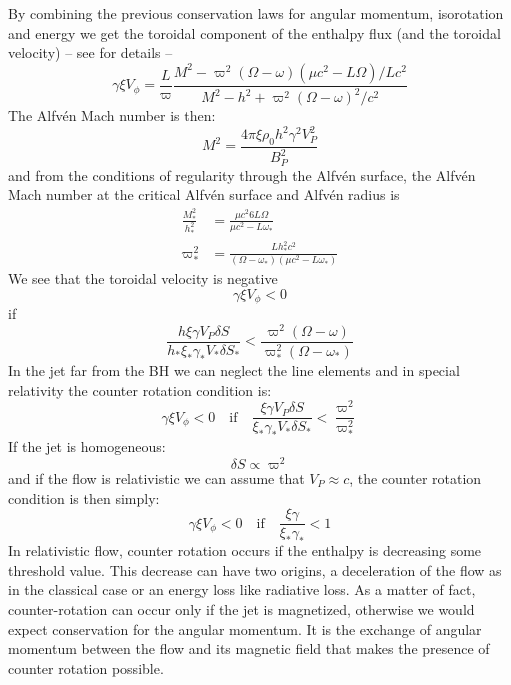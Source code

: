 \documentclass[10pt,a4paper,english]{article}
\begin{document}
By combining the previous conservation laws for angular momentum,
isorotation and energy we get the toroidal component of the enthalpy
flux (and the toroidal velocity) -- see \cite{2014ApJ...788L..19C} for
details --
\begin{equation}
  \gamma\xi V_\phi = \frac{L}{\varpi} \frac{M^2 - \varpi^2 (\Omega - \omega) (\mu c^2 - L \Omega) / Lc^2 }{M^2 - h^2 + \varpi^2 (\Omega - \omega)^2 / c^2}
\end{equation}
The Alfvén Mach number is then:
\begin{equation}
  M^2 = \frac{4\pi\xi\rho_0 h^2\gamma^2 V_P^2}{B_P^2}
\end{equation}
and from the conditions of regularity through the Alfvén surface, the
Alfvén Mach number at the critical Alfvén surface and Alfvén radius is
\begin{align}
  \frac{M_*^2}{h_*^2} & = \frac{\mu c^2 6 L\Omega}{\mu c^2 - L\omega_*}\\
  \varpi_*^2 & = \frac{Lh_*^2 c^2}{(\Omega - \omega_*)(\mu c^2 - L\omega_*)}
\end{align}
We see that the toroidal velocity is negative
\begin{equation}
  \gamma\xi V_\phi < 0
\end{equation}
if
\begin{equation}
  \frac{h \xi\gamma V_P \delta S}{h_* \xi_* \gamma_* V_* \delta S_*} < \frac{\varpi^2 (\Omega - \omega)}{\varpi_*^2(\Omega - \omega_*)}
\end{equation}
In the jet far from the BH we can neglect the line elements and in
special relativity the counter rotation condition is:
\begin{equation}
  \gamma\xi V_\phi < 0 \quad \textrm{if} \quad \frac{\xi\gamma V_P\delta S}{\xi_*\gamma_* V_* \delta S_*} < \frac{\varpi^2}{\varpi_*^2}
\end{equation}
If the jet is homogeneous:
\begin{equation}
  \delta S \propto \varpi^2
\end{equation}
and if the flow is relativistic we can assume that $V_P \approx c$,
the counter rotation condition is then simply:
\begin{equation}
  \gamma\xi V_\phi < 0 \quad \textrm{if} \quad \frac{\xi\gamma}{\xi_*\gamma_*} < 1
\end{equation}
In relativistic flow, counter rotation occurs if the enthalpy is
decreasing some threshold value. This decrease can have two origins, a
deceleration of the flow as in the classical case or an energy loss
like radiative loss. As a matter of fact, counter-rotation can occur
only if the jet is magnetized, otherwise we would expect conservation
for the angular momentum. It is the exchange of angular momentum
between the flow and its magnetic field that makes the presence of
counter rotation possible.
\end{document}

